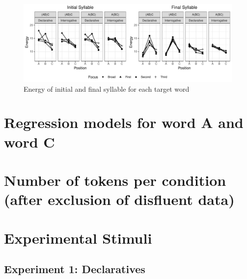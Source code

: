 \documentclass[preprint,review,12pt,authoryear,times]{elsarticle}
\begin{document}
\begin{figure}[htb!]
	\begin{center}
		\includegraphics[width=5in]{Figures/Energy.pdf}
		\caption{Energy of initial and final syllable for each target word}
		\label{figureEnergy}
	\end{center}
\end{figure}


\newpage
\section{Regression models for word A and word C}














\newpage

\section{Number of tokens per condition (after exclusion of disfluent data)}



\newpage

\section{Experimental Stimuli}

\setcounter{ExNo}{0}

\subsection*{Experiment 1: Declaratives}
\end{document}
